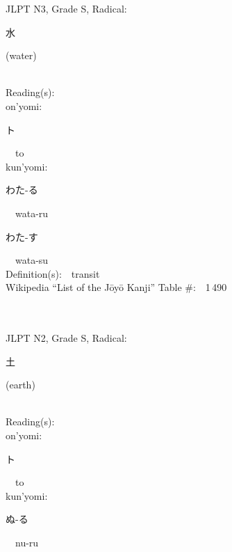 \begin{multicols}{2}
{JLPT N3, Grade S, Radical:\ \ {\begin{CJK}{UTF8}{min} 水 \end{CJK}} (water) } \\
Reading(s):\ \ \\
{\hspace*{1em}}on'yomi:\ \ \\
{\hspace*{2em}}{\begin{CJK}{UTF8}{min} ト \end{CJK}}\ \ to\ \ \\
{\hspace*{1em}}kun'yomi:\ \ \\
{\hspace*{2em}}{\begin{CJK}{UTF8}{min} わた-る \end{CJK}}\ \ wata-ru\ \ \\
{\hspace*{2em}}{\begin{CJK}{UTF8}{min} わた-す \end{CJK}}\ \ wata-su\ \ \\
Definition(s):\ \ transit \\
Wikipedia ``List of the J\=oy\=o Kanji'' Table \#:\ \ 1\,490 \\
\ \ \\
{\fontsize{34pt}{40pt}  }\ \ \\  %
{JLPT N2, Grade S, Radical:\ \ {\begin{CJK}{UTF8}{min} 土 \end{CJK}} (earth) } \\
Reading(s):\ \ \\
{\hspace*{1em}}on'yomi:\ \ \\
{\hspace*{2em}}{\begin{CJK}{UTF8}{min} ト \end{CJK}}\ \ to\ \ \\
{\hspace*{1em}}kun'yomi:\ \ \\
{\hspace*{2em}}{\begin{CJK}{UTF8}{min} ぬ-る \end{CJK}}\ \ nu-ru\ \ \\

\end{multicols}
